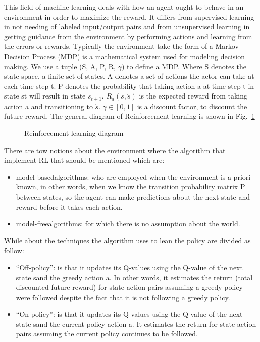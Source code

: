 \label{cha:RL}
This field of machine learning deals with how an agent ought to behave in an environment in order to maximize the reward. It differs from supervised learning in not needing of labeled input/output pairs and from unsupervised learning in getting guidance from the environment by performing actions and learning from the errors or rewards. Typically the environment take the form of a Markov Decision Process (MDP) is a mathematical system used for modeling decision making. We use a tuple (S, A, P, R, $\gamma$) to define a MDP. Where S denotes the state space, a finite set of states. A denotes a set of actions the actor can take at each time step t. P denotes the probability that taking action a at time step t in state st will result in state $s_{t+1}$. $R_a(s,\acute{s})$ is the expected reward from taking action a and transitioning to $\acute{s}$. $\gamma \in [0, 1]$ is a discount factor, to discount the future reward. The general diagram of Reinforcement learning is shown in Fig.~\ref{fig:RL}
\begin{figure}
	\centerline
	\RL
	\caption{Reinforcement learning diagram}
	\label{fig:RL}
\end{figure} 
\vspace{0.3cm}
There are tow notions about the environment where the algorithm that implement RL that should be mentioned which are:
\begin{itemize}
	\item \textacutedbl model-based\textacutedbl algorithms: who are employed when the environment is a priori known, in other words, when we know the transition probability matrix P between states, so the agent can make predictions about the next state and reward before it takes each action.
\end{itemize}
\begin{itemize}
	\item \textacutedbl model-free\textacutedbl algorithms: for which there is no assumption about the world.
\end{itemize}
While about the techniques the algorithm uses to lean the policy are divided as follow:
\begin{itemize}
	\item \textquotedblleft Off-policy\textquotedblright: is that it updates its Q-values using the Q-value of the next state s\textasciigrave and the greedy action a\textasciigrave. In other words, it estimates the return (total discounted future reward) for state-action pairs assuming a greedy policy were followed despite the fact that it is not following a greedy policy.
\end{itemize}
\begin{itemize}
	\item \textquotedblleft On-policy\textquotedblright: is that it updates its Q-values using the Q-value of the next state s\textasciigrave and the current policy action a. It estimates the return for state-action pairs assuming the current policy continues to be followed.
\end{itemize}


